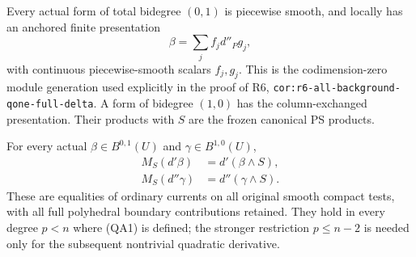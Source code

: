 Every actual form of total bidegree $(0,1)$ is piecewise smooth,
and locally has an anchored finite presentation
\[
                    \beta=\sum_j f_jd''_Pg_j,        \tag{QA3}
\]
with continuous piecewise-smooth scalars $f_j,g_j$.  This is the
codimension-zero module generation used explicitly in the proof of
R6, \texttt{cor:r6-all-background-qone-full-delta}.  A form of
bidegree $(1,0)$ has the column-exchanged presentation.
Their products with $S$ are the frozen canonical PS products.

\begin{lemma}
For every actual $\beta\in B^{0,1}(U)$ and
$\gamma\in B^{1,0}(U)$,
\[
 \begin{split}
 M_S(d'\beta)&=d'(\beta\wedge S),\\
 M_S(d''\gamma)&=d''(\gamma\wedge S).
 \end{split}                                          \tag{QA4}
\]
These are equalities of ordinary currents on all original smooth
compact tests, with all full polyhedral boundary contributions
retained.  They hold in every degree $p<n$ where (QA1) is defined;
the stronger restriction $p\le n-2$ is needed only for the
subsequent nontrivial quadratic derivative.
\end{lemma}

